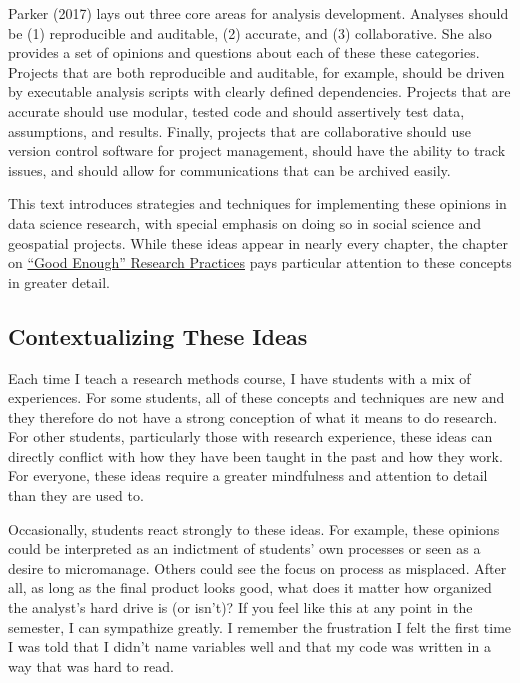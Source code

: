 \documentclass[]{book}
\theoremstyle{definition}
\theoremstyle{definition}
\theoremstyle{definition}
\theoremstyle{remark}
\begin{document}
Parker (2017) lays out three core areas for analysis development.
Analyses should be (1) reproducible and auditable, (2) accurate, and (3)
collaborative. She also provides a set of opinions and questions about
each of these these categories. Projects that are both reproducible and
auditable, for example, should be driven by executable analysis scripts
with clearly defined dependencies. Projects that are accurate should use
modular, tested code and should assertively test data, assumptions, and
results. Finally, projects that are collaborative should use version
control software for project management, should have the ability to
track issues, and should allow for communications that can be archived
easily.

This text introduces strategies and techniques for implementing these
opinions in data science research, with special emphasis on doing so in
social science and geospatial projects. While these ideas appear in
nearly every chapter, the chapter on
\protect\hyperlink{good-enough-research-practices}{``Good Enough''
Research Practices} pays particular attention to these concepts in
greater detail.

\subsection{Contextualizing These
Ideas}\label{contextualizing-these-ideas}

Each time I teach a research methods course, I have students with a mix
of experiences. For some students, all of these concepts and techniques
are new and they therefore do not have a strong conception of what it
means to do research. For other students, particularly those with
research experience, these ideas can directly conflict with how they
have been taught in the past and how they work. For everyone, these
ideas require a greater mindfulness and attention to detail than they
are used to.

Occasionally, students react strongly to these ideas. For example, these
opinions could be interpreted as an indictment of students' own
processes or seen as a desire to micromanage. Others could see the focus
on process as misplaced. After all, as long as the final product looks
good, what does it matter how organized the analyst's hard drive is (or
isn't)? If you feel like this at any point in the semester, I can
sympathize greatly. I remember the frustration I felt the first time I
was told that I didn't name variables well and that my code was written
in a way that was hard to read.
\end{document}
